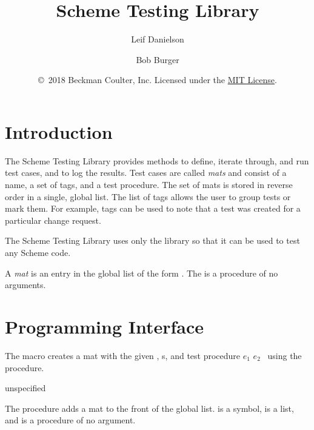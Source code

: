 \documentclass[letterpaper,11pt,twoside,final]{article}
\begin{document}
\title {Scheme Testing Library}
\author {Leif Danielson \and Bob Burger}
\date {\copyright\ 2018 Beckman Coulter, Inc.
  Licensed under the \href{https://opensource.org/licenses/MIT}{MIT License}.}
\maketitle

\section* {Introduction}

The Scheme Testing Library  provides methods to
define, iterate through, and run test cases, and to log the
results. Test cases are called \emph{mats} and consist of a name, a
set of tags, and a test procedure.  The set of mats is stored in
reverse order in a single, global list.  The list of tags allows the
user to group tests or mark them.  For example, tags can be used to
note that a test was created for a particular change request.

The Scheme Testing Library uses only the 
library so that it can be used to test any Scheme code.

A \emph{mat} is an entry in the global list of the form
. The  is a
procedure of no arguments.

\section* {Programming Interface}

\begin{syntax}
\end{syntax}
\expandsto{} 

The  macro creates a mat with the given ,
s, and test procedure $e_1$ $e_2$ \etc\ using the
 procedure.

\begin{procedure}
\end{procedure}
\returns{} unspecified

The  procedure adds a mat to the front of the global
list.  is a symbol,  is a list, and  is
a procedure of no argument.
\end{document}
